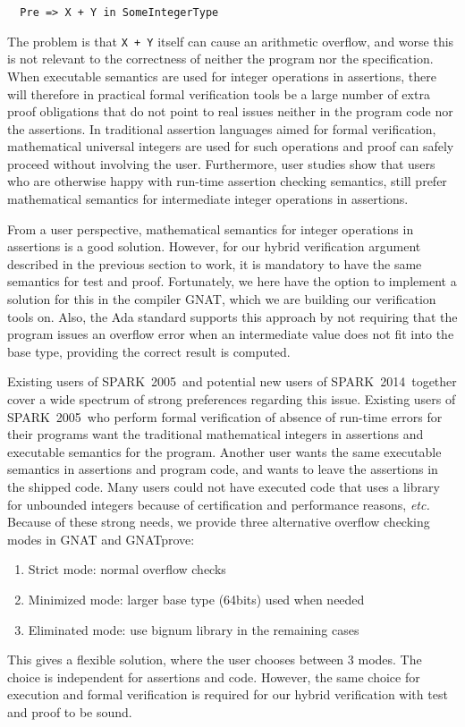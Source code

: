 \documentclass[sttt,draft]{svjour}
\newcommand{\gnatprove}{GNATprove\xspace}
\newcommand{\oldspark}{SPARK~2005\xspace}
\newcommand{\newspark}{SPARK~2014\xspace}
\newcommand{\etc}{\textit{etc.}\xspace}
\begin{document}
\begin{footnotesize}
\begin{verbatim}
  Pre => X + Y in SomeIntegerType
\end{verbatim}
\end{footnotesize}

\noindent
The problem is that
\verb|X + Y| itself can cause an arithmetic overflow, and worse this
is not relevant to the correctness of neither the program nor the
specification. When executable semantics are used for integer
operations in assertions, there will therefore in practical formal
verification tools be a large number of extra proof obligations that do not
point to real issues neither in the program code nor the assertions. In
traditional assertion languages aimed for formal verification,
mathematical universal integers are used for such operations and proof
can safely proceed without involving the user. Furthermore, user
studies \cite{jotChalin04} show that users who are otherwise happy
with run-time assertion checking semantics, still prefer mathematical
semantics for intermediate integer operations in assertions.

From a user perspective, mathematical semantics for integer operations in
assertions is a good solution. However, for our hybrid verification argument
described in the previous section to work, it is mandatory to have the same
semantics for test and proof. Fortunately, we here have the option to implement
a solution for this in the compiler GNAT, which we are building our
verification tools on. Also, the Ada standard supports this approach by not
requiring that the program issues an overflow error when an intermediate value
does not fit into the base type, providing the correct result is computed.

Existing users of \oldspark\ and potential new users of \newspark\
together cover a wide spectrum of strong preferences regarding this
issue. Existing users of \oldspark\ who perform formal verification of
absence of run-time errors for their programs want the traditional
mathematical integers in assertions and executable semantics for the
program. Another user wants the same executable semantics in
assertions and program code, and wants to leave the assertions in the
shipped code. Many users could not have executed code that uses a
library for unbounded integers because of certification and
performance reasons, \etc Because of these strong needs, we provide
three alternative overflow checking modes in GNAT and \gnatprove:
\begin{enumerate}
\item Strict mode: normal overflow checks
\item Minimized mode: larger base type (64bits) used when needed
\item Eliminated mode: use bignum library in the remaining cases
\end{enumerate}
This gives a flexible solution, where the user chooses between 3
modes. The choice is independent for assertions and code. However, the
same choice for execution and formal verification is required for our
hybrid verification with test and proof to be sound.
\end{document}

